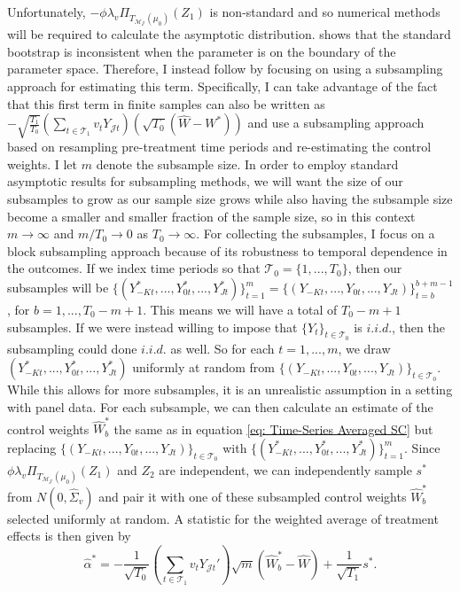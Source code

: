 \documentclass{article}
\begin{document}
Unfortunately, $-\phi \lambda_v \Pi_{T_{\mathcal{M}_{\mathcal{J}}}(\mu_0)}(Z_1)$ is non-standard and so numerical methods will be required to calculate the asymptotic distribution. \cite{BootstrapInconsistency} shows that the standard bootstrap is inconsistent when the parameter is on the boundary of the parameter space. Therefore, I instead follow \cite{Li2020} by focusing on using a subsampling approach for estimating this term. Specifically, I can take advantage of the fact that this first term in finite samples can also be written as $-\sqrt{\frac{T_1}{T_0}}(\sum_{t \in \mathcal{T}_1} v_t Y_{\mathcal{J}t})(\sqrt{T_0}(\hat{W} - W^*))$ and use a subsampling approach based on resampling pre-treatment time periods and re-estimating the control weights. I let $m$ denote the subsample size. In order to employ standard asymptotic results for subsampling methods, we will want the size of our subsamples to grow as our sample size grows while also having the subsample size become a smaller and smaller fraction of the sample size, so in this context $m \rightarrow \infty$ and $m/T_0 \rightarrow 0$ as $T_0 \rightarrow \infty$. For collecting the subsamples, I focus on a block subsampling approach because of its robustness to temporal dependence in the outcomes. If we index time periods so that $\mathcal{T}_0 = \{1,...,T_0\}$, then our subsamples will be $\{(Y_{-Kt}^*,...,Y_{0t}^*,...,Y_{Jt}^*)\}_{t = 1}^m = \{(Y_{-Kt},...,Y_{0t},...,Y_{Jt})\}_{t = b}^{b+m-1}$, for $b = 1,...,T_0 - m +1$. This means we will have a total of $T_0 - m + 1$ subsamples. If we were instead willing to impose that $\{Y_t\}_{t \in \mathcal{T}_0}$ is $i.i.d.$, then the subsampling could done $i.i.d.$ as well. So for each $t = 1,...,m$, we draw $(Y_{-Kt}^*,...,Y_{0t}^*,...,Y_{Jt}^*)$ uniformly at random from $\{(Y_{-Kt},...,Y_{0t},...,Y_{Jt})\}_{t \in \mathcal{T}_0}$. While this allows for more subsamples, it is an unrealistic assumption in a setting with panel data. For each subsample, we can then calculate an estimate of the control weights $\hat{W}_b^*$ the same as in equation \eqref{eq: Time-Series Averaged SC} but replacing $\{(Y_{-Kt},...,Y_{0t},...,Y_{Jt})\}_{t \in \mathcal{T}_0}$ with $\{(Y_{-Kt}^*,...,Y_{0t}^*,...,Y_{Jt}^*)\}_{t = 1}^m$. Since $\phi \lambda_v \Pi_{T_{\mathcal{M}_{\mathcal{J}}}(\mu_0)}(Z_1)$ and $Z_2$ are independent, we can independently sample $s^*$ from $N(0,\hat{\Sigma}_v)$ and pair it with one of these subsampled control weights $\hat{W}_b^*$ selected uniformly at random. A statistic for the weighted average of treatment effects is then given by
\begin{equation*}
    \hat{\alpha}^* = - \frac{1}{\sqrt{T_0}}(\sum_{t \in \mathcal{T}_1} v_t Y_{\mathcal{J} t}') \sqrt{m} (\hat{W}_b^* - \hat{W}) + \frac{1}{\sqrt{T_1}} s^*.
\end{equation*}
\end{document}
